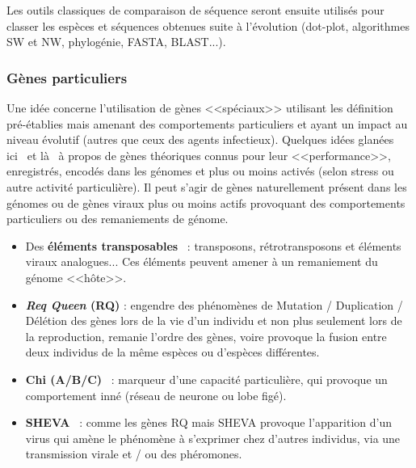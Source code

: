 \documentclass[11pt,twoside,a4paper]{article}
\begin{document}
Les outils classiques de comparaison de s{\'e}quence seront ensuite utilis{\'e}s pour classer les esp{\`e}ces et s{\'e}quences obtenues suite {\`a} l'{\'e}volution (dot-plot, algorithmes SW et NW, phylog{\'e}nie, FASTA, BLAST...). 

\subsubsection{G{\`e}nes particuliers}

Une id{\'e}e concerne l'utilisation de g{\`e}nes <<sp{\'e}ciaux>> utilisant les d{\'e}finition pr{\'e}-{\'e}tablies mais amenant des comportements particuliers et ayant un impact au niveau {\'e}volutif (autres que ceux des agents infectieux). Quelques id{\'e}es glan{\'e}es ici~\cite{BearDarwin01,BearDarwin03} et l{\`a}~\cite{DiasporaKubeMc} {\`a} propos de g{\`e}nes th{\'e}oriques connus pour leur <<performance>>, enregistr{\'e}s, encod{\'e}s dans les g{\'e}nomes et plus ou moins activ{\'e}s (selon stress ou autre activit{\'e} particuli{\`e}re). Il peut s'agir de g{\`e}nes naturellement pr{\'e}sent dans les g{\'e}nomes ou de g{\`e}nes viraux plus ou moins actifs provoquant des comportements particuliers ou des remaniements de g{\'e}nome. 
\begin{itemize}
	\item Des \textbf{{\'e}l{\'e}ments transposables}~\cite{LeRiBi03,RiBiGo02,RiMaGo02} : transposons, r{\'e}trotransposons et {\'e}l{\'e}ments viraux analogues... Ces {\'e}l{\'e}ments peuvent amener {\`a} un remaniement du g{\'e}nome <<h{\^o}te>>.
	\item \textbf{\emph{Req Queen} (RQ)} : engendre des ph{\'e}nom{\`e}nes de Mutation / Duplication / D{\'e}l{\'e}tion des g{\`e}nes lors de la vie d'un individu et non plus seulement lors de la reproduction, remanie l'ordre des g{\`e}nes, voire provoque la fusion entre deux individus de la m{\^e}me esp{\`e}ces ou d'esp{\`e}ces diff{\'e}rentes. 
	\item \textbf{Chi (A/B/C)}~\cite{DiasporaKubeMc} : marqueur d'une capacit{\'e} particuli{\`e}re, qui provoque un comportement inn{\'e} (r{\'e}seau de neurone ou lobe fig{\'e}). 
	\item \textbf{SHEVA}~\cite{BearDarwin01,BearDarwin03} : comme les g{\`e}nes RQ mais SHEVA provoque l'apparition d'un virus qui am{\`e}ne le ph{\'e}nom{\`e}ne {\`a} s'exprimer chez d'autres individus, via une transmission virale et / ou des ph{\'e}romones. 
\end{itemize}
\end{document}
